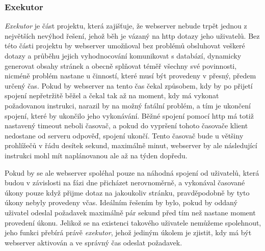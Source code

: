 \subsubsection{Exekutor}

\emph{Exekutor} je část projektu, která zajišťuje, že webserver nebude trpět jednou z největších nevýhod řešení, jehož běh je vázaný na \acrshort{http} dotazy jeho uživatelů. Bez této části projektu by webserver umožňoval bez problémů obsluhovat veškeré dotazy a průběhu jejich vyhodnocování komunikovat s databází, dynamicky generovat obsahy stránek a obecně splňovat téměř všechny své povinnosti, nicméně problém nastane u činností, které musí být provedeny v přesný, předem určený čas. Pokud by webserver na tento čas čekal způsobem, kdy by po přijetí spojení nepřetržitě běžel a čekal tak až na moment, kdy má vykonat požadovanou instrukci, narazil by na možný fatální problém, a tím je ukončení spojení, které by ukončilo jeho vykonávání. Běžné spojení pomocí \acrshort{http} má totiž nastavený timeout neboli časovač, a pokud do vypršení tohoto časovače klient nedostane od serveru odpověď, spojení ukončí. Tento časovač bude u většiny prohlížečů v řádu desítek sekund, maximálně minut, webserver by ale následující instrukci mohl mít naplánovanou ale až na týden dopředu.

Pokud by se ale webserver spoléhal pouze na náhodná spojení od uživatelů, která budou v závislosti na fázi dne přicházet nerovnoměrně, a vykonával časované úkony pouze když přijme dotaz na jakoukoliv stránku, pravděpodobně by tyto úkony nebyly provedeny včas. Ideálním řešením by bylo, pokud by oddaný uživatel odeslal požadavek maximálně pár sekund před tím než nastane moment provedení úkonu. Jelikož se na existenci takového uživatele nemůžeme spolehnout, jeho funkci přebírá právě \emph{exekutor}, jehož jediným úkolem je zjistit, kdy má být webserver aktivován a ve správný čas odeslat požadavek.


